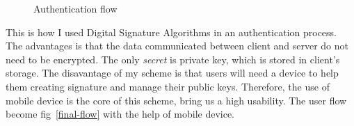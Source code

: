 \begin{CJK}{Bg5}{bsmi}
\begin{figure}
\centering
{}
\caption{Authentication flow}
\end{figure}

This is how I used Digital Signature Algorithms in an authentication process. The advantages is that the data communicated between client and server do not need to be encrypted. The only \emph{secret} is private key, which is stored in client's storage. The disavantage of my scheme is that users will need a device to help them creating signature and manage their public keys. Therefore, the use of mobile device is the core of this scheme, bring us a high usability. The user flow become fig~\ref{final-flow} with the help of mobile device.


\end{CJK}
